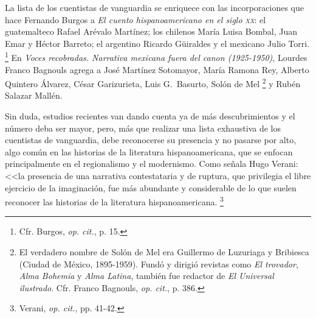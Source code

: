 \documentclass[14pt,twoside,final]{extbook} %
\let\oldfootnote\footnote
\renewcommand\footnote[1]{%
\oldfootnote{\hspace{1mm}#1}}
\begin{document}
La lista de los cuentistas de vanguardia se enriquece con las incorporaciones que hace Fernando Burgos a \emph{El cuento hispanoamericano en el siglo \textsc{xx}}: el guatemalteco Rafael Arévalo Martínez; los chilenos María Luisa Bombal, Juan Emar y Héctor Barreto; el argentino Ricardo Güiraldes y el mexicano Julio Torri.\footnote{Cfr. Burgos, \emph{op. cit.}, p. 15.} En \emph{Voces recobradas. Narrativa mexicana fuera del canon (\mbox{1925-1950})}, Lourdes Franco Bagnouls agrega a José Martínez Sotomayor, María Ramona Rey, Alberto Quintero Álvarez, César Garizurieta, Luis G.~Basurto, Solón de Mel\footnote{El verdadero nombre de Solón de Mel era Guillermo de Luzuriaga y Bribiesca (Ciudad de México, 1895-1959). Fundó y dirigió revistas como \emph{El trovador}, \emph{Alma Bohemia} y \emph{Alma Latina}, también fue redactor de \emph{El Universal ilustrado}. Cfr. Franco Bagnouls, \emph{op. cit.}, p. 386.} y Rubén Salazar Mallén.

Sin duda, estudios recientes van dando cuenta ya de más descubrimientos y el número deba ser mayor, pero, más que realizar una lista exhaustiva de los cuentistas de vanguardia, debe reconocerse su presencia y no pasarse por alto, algo común en las historias de la literatura hispanoamericana, que se enfocan principalmente en el regionalismo y el modernismo. Como señala Hugo Verani: <<la presencia de una narrativa contestataria y de ruptura, que privilegia el libre ejercicio de la imaginación, fue más abundante y considerable de lo que suelen reconocer las historias de la literatura hispanoamericana.\footnote{Verani, \emph{op. cit.}, pp. 41-42.}
\end{document}
